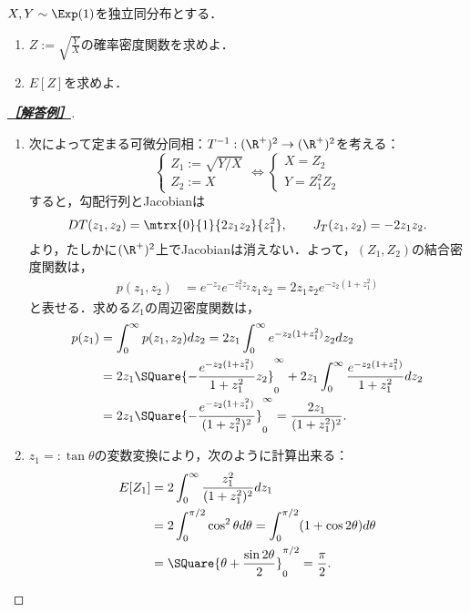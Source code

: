 \documentclass[uplatex,dvipdfmx]{jsarticle}
\begin{document}
\begin{tcolorbox}[colframe=ForestGreen, colback=ForestGreen!10!white,breakable,colbacktitle=ForestGreen!40!white,coltitle=black,fonttitle=\bfseries\sffamily,
    title=第４問]
    \begin{problem}\label{prob-19-8-4-Exp-density}
        $X,Y\sim\Exp(1)$を独立同分布とする．
    \begin{enumerate}
        \item $Z:=\sqrt{\frac{Y}{X}}$の確率密度関数を求めよ．
        \item $E[Z]$を求めよ．
    \end{enumerate}
    \end{problem}
\end{tcolorbox}
\begin{proof}[\textbf{\underline{［解答例］}}]\mbox{}
    \begin{enumerate}
        \item 次によって定まる可微分同相：$T^{-1}:(\R^+)^2\to(\R^+)^2$を考える：
        \[\begin{cases}
            Z_1:=\sqrt{Y/X}\\
            Z_2:=X
        \end{cases}\Leftrightarrow\begin{cases}
            X=Z_2\\
            Y=Z_1^2Z_2
        \end{cases}\]
        すると，勾配行列とJacobianは
        \[DT(z_1,z_2)=\mtrx{0}{1}{2z_1z_2}{z_1^2},\qquad J_T(z_1,z_2)=-2z_1z_2.\]
        より，たしかに$(\R^+)^2$上でJacobianは消えない．よって，$(Z_1,Z_2)$の結合密度関数は，
        \begin{align*}
            p(z_1,z_2)&=e^{-z_2}e^{-z_1^2z_2}z_1z_2=2z_1z_2e^{-z_2(1+z_1^2)}
        \end{align*}
        と表せる．求める$Z_1$の周辺密度関数は，
        \begin{align*}
            p(z_1)&=\int_0^\infty p(z_1,z_2)dz_2=2z_1\int^\infty_0e^{-z_2(1+z_1^2)}z_2dz_2\\
            &=2z_1\SQuare{-\frac{e^{-z_2(1+z_1^2)}}{1+z_1^2}z_2}^\infty_0+2z_1\int^\infty_0\frac{e^{-z_2(1+z_1^2)}}{1+z_1^2}dz_2\\
            &=2z_1\SQuare{-\frac{e^{-z_2(1+z_1^2)}}{(1+z_1^2)^2}}^\infty_0=\frac{2z_1}{(1+z_1^2)^2}.
        \end{align*}
        \item $z_1=:\tan\theta$の変数変換により，次のように計算出来る：
        \begin{align*}
            E[Z_1]&=2\int^\infty_0\frac{z_1^2}{(1+z_1^2)^2}dz_1\\
            &=2\int^{\pi/2}_0\cos^2\theta d\theta=
            \int^{\pi/2}_0(1+\cos 2\theta)d\theta\\
            &=\SQuare{\theta+\frac{\sin2\theta}{2}}^{\pi/2}_0=\frac{\pi}{2}.
        \end{align*}
    \end{enumerate}
\end{proof}
\end{document}
